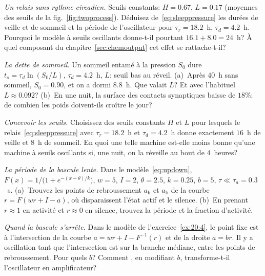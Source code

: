 \begin{exercise}[\lvlA]
\label{ex:20:1}
\emph{Un relais sans rythme circadien.} Seuils constants: $H=0.67$, $L=0.17$ (moyennes des seuils de la fig.~\ref{fig:twoprocess}). Déduisez de~\eqref{eq:sleeppressure} les durées de veille et de sommeil et la période de l'oscillateur pour $\tau_r=18.2$~h, $\tau_d=4.2$~h. Pourquoi le modèle à seuils oscillants donne-t-il pourtant $16.1+8.0=24$~h? À quel composant du chapitre~\ref{sec:chemoutput} cet effet se rattache-t-il?
\end{exercise}

\begin{exercise}[\lvlA]
\label{ex:20:2}
\emph{La dette de sommeil.} Un sommeil entamé à la pression $S_0$ dure $t_s=\tau_d\ln(S_0/L)$, $\tau_d=4.2$~h, $L$: seuil bas au réveil. (a)~Après $40$~h sans sommeil, $S_0=0.90$, et on a dormi $8.8$~h. Que valait $L$? Et avec l'habituel $L\approx0.092$? (b)~En une nuit, la surface des contacts synaptiques baisse de $18\%$: de combien les poids doivent-ils croître le jour?
\end{exercise}

\begin{exercise}[\lvlB]
\label{ex:20:3}
\emph{Concevoir les seuils.} Choisissez des seuils constants $H$ et $L$ pour lesquels le relais~\eqref{eq:sleeppressure} avec $\tau_r=18.2$~h et $\tau_d=4.2$~h donne exactement $16$~h de veille et $8$~h de sommeil. En quoi une telle machine est-elle moins bonne qu'une machine à seuils oscillants si, une nuit, on la réveille au bout de $4$~heures?
\end{exercise}

\begin{exercise}[\lvlB]
\label{ex:20:4}
\emph{La période de la bascule lente.} Dans le modèle~\eqref{eq:updown}, $F(x)=1/\bigl(1+e^{-(x-\theta)/k}\bigr)$, $w=5$, $I=2$, $\theta=2.5$, $k=0.25$, $b=5$, $\tau\ll\tau_a=0.3$~s. (a)~Trouvez les points de rebroussement $a_{\text{h}}$ et $a_{\text{b}}$ de la courbe $r=F(wr+I-a)$, où disparaissent l'état actif et le silence. (b)~En prenant $r\approx1$ en activité et $r\approx0$ en silence, trouvez la période et la fraction d'activité.
\end{exercise}

\begin{exercise}[\lvlB]
\label{ex:20:5}
\emph{Quand la bascule s'arrête.} Dans le modèle de l'exercice~\ref{ex:20:4}, le point fixe est à l'intersection de la courbe $a=wr+I-F^{-1}(r)$ et de la droite $a=br$. Il y a oscillation tant que l'intersection est sur la branche médiane, entre les points de rebroussement. Pour quels $b$? Comment , en modifiant $b$, transforme-t-il l'oscillateur en amplificateur?
\end{exercise}

